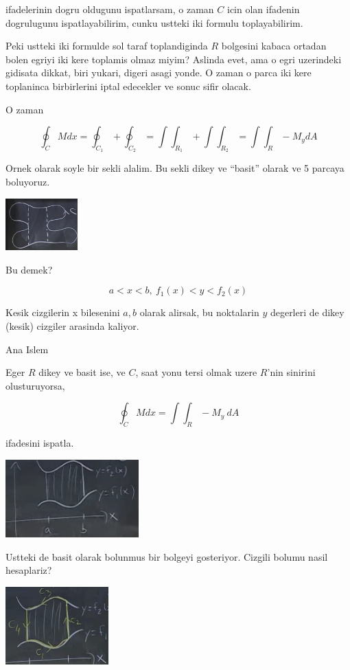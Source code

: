 \documentclass[12pt,fleqn]{article}\usepackage{../common}
\begin{document}
ifadelerinin dogru oldugunu ispatlarsam, o zaman $C$ icin olan ifadenin
dogrulugunu ispatlayabilirim, cunku ustteki iki formulu toplayabilirim. 

Peki ustteki iki formulde sol taraf toplandiginda $R$ bolgesini kabaca
ortadan bolen egriyi iki kere toplamis olmaz miyim? Aslinda evet, ama o
egri uzerindeki gidisata dikkat, biri yukari, digeri asagi yonde. O zaman o
parca iki kere toplaninca birbirlerini iptal edecekler ve sonuc sifir olacak.

O zaman 

\[ \oint_C M dx = \oint_{C_1} + \oint_{C_2} =
\int \int_{R_1} + \int \int_{R_2} = 
\int \int_R -M_ydA
\]

Ornek olarak soyle bir sekli alalim. Bu sekli dikey ve ``basit'' olarak ve
5 parcaya boluyoruz.

\includegraphics[height=2cm]{22_6.png}

Bu demek? 

\[ a < x < b, \ f_1(x) < y < f_2(x) \]

Kesik cizgilerin x bilesenini $a,b$ olarak alirsak, bu noktalarin $y$
degerleri de dikey (kesik) cizgiler arasinda kaliyor. 

Ana Islem

Eger $R$ dikey ve basit ise, ve $C$, saat yonu tersi olmak uzere $R$'nin
sinirini olusturuyorsa, 

\[ \oint_C M dx  = \int \int_R -M_y \ dA \]

ifadesini ispatla. 

\includegraphics[height=3cm]{22_7.png}

Ustteki de basit olarak bolunmus bir bolgeyi gosteriyor. Cizgili bolumu
nasil hesaplariz?

\includegraphics[height=3cm]{22_8.png}
\end{document}
